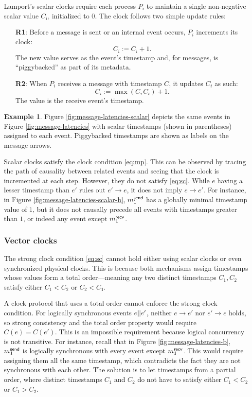 \documentclass[]             %
{NASA}                       %
\theoremstyle{definition}
\newtheorem{example}[theorem]{Example}
\begin{document}
Lamport's scalar clocks \cite{1978:lamportclocks} require each
process $P_i$ to maintain a single non-negative scalar value $C_i$,
initialized to $0$. The clock follows two simple update rules:
\begin{enumerate}
\item[\textbf{R1}:] Before a message is sent or an internal event occurs, $P_i$
  increments its clock:
  \[C_i := C_i + 1.\]
  The new value serves as the event's timestamp and, for messages, is ``piggybacked''
  as part of its metadata.
\item[\textbf{R2}:] When $P_i$ receives a message with timestamp $C$, it
  updates $C_i$ as such:
  \[C_i := \max(C, C_i) + 1.\]
  The value is the receive event's timestamp.
\end{enumerate}

\begin{example}
  Figure \ref{fig:message-latencies-scalar} depicts the same events in
  Figure \ref{fig:message-latencies} with scalar timestamps (shown in
  parentheses) assigned to each event. Piggybacked timestamps are
  shown as labels on the message arrows.
\end{example}

Scalar clocks satisfy the clock condition \eqref{eq:mp}. This can be
observed by tracing the path of causality between related events and
seeing that the clock is incremented at each step. However, they do
not satisfy \eqref{eq:sc}.  While $e$ having a lesser timestamp than
$e'$ rules out $e' \to e$, it does not imply $e \to e'$. For instance,
in Figure \ref{fig:message-latencies-scalar-b}, $m_{1}^{\mathsf{send}}$ has a
globally minimal timestamp value of $1$, but it does not causally
precede all events with timestamps greater than $1$, or indeed any
event except $m_{1}^{\mathsf{recv}}$.

\subsubsection{Vector clocks}
\label{sssec:vector-clocks}
The strong clock condition \eqref{eq:sc} cannot hold either using
scalar clocks or even synchronized physical clocks. This is because
both mechanisms assign timestamps whose values form a total order---meaning any
two distinct timestamps $C_1, C_2$ satisfy either $C_1 < C_2$ or $C_2 < C_1$.

A clock protocol that uses a total order cannot enforce the strong
clock condition. For logically synchronous events $e || e'$,
neither $e \to e'$ nor $e' \to e$ holds, so strong consistency and the
total order property would require $C(e) = C(e')$. This is an
impossible requirement because logical concurrency is not
transitive. For instance, recall that in Figure
\ref{fig:message-latencies-b}, $m_{1}^{\mathsf{send}}$ is logically synchronous
with every event except $m_{1}^{\mathsf{recv}}$. This would require assigning them
all the same timestamp, which contradicts the fact they are not
synchronous with each other. The solution is to let timestamps from a
partial order, where distinct timestamps $C_1$ and $C_2$ do not have
to satisfy either $C_1 < C_2$ or $C_1 > C_2$.
\end{document}
